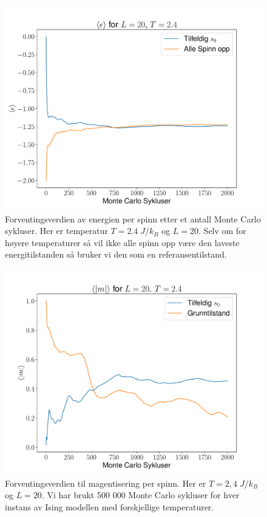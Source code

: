 \documentclass[reprint,english,notitlepage]{revtex4-2}  %
\begin{document}
\begin{figure}[H]
\centering
\includegraphics[scale=0.4, trim=1.7cm 0 0 0 ]{../Images/meanepsT24L20.pdf}
\caption{Forventingsverdien av energien per spinn etter et antall Monte Carlo sykluser. Her er temperatur $T = 2.4 \; J/k_B$ og $L=20$. Selv om for høyere temperaturer så vil ikke alle spinn opp være den laveste energitilstanden så bruker vi den som en referansentilstand. }
\label{Fig:5e24}
\end{figure}

\begin{figure}[H]
\centering
\includegraphics[scale=0.4, trim=2.5cm 0 0 0 ]{../Images/meanmT24L20.pdf}
\caption{Forventingsverdien til magentisering per spinn. Her er $T=2,4 \; J/k_B$ og $L = 20$. Vi har brukt 500 000 Monte Carlo sykluser for hver instans av Ising modellen med forskjellige temperaturer. }
\label{Fig:5m24}
\end{figure}
\end{document}
